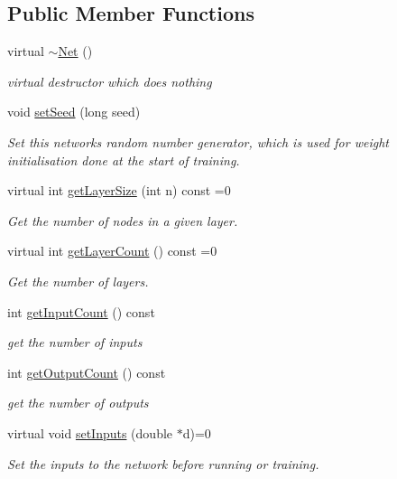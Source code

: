 \subsection*{Public Member Functions}
\begin{DoxyCompactItemize}
\item 
virtual \hyperlink{classNet_a882ce3a3037e5fe06f1a11f87cb0629d}{$\sim$\+Net} ()
\begin{DoxyCompactList}\small\item\em virtual destructor which does nothing \end{DoxyCompactList}\item 
void \hyperlink{classNet_a2ef424e05bfeff073bbca57a5735c121}{set\+Seed} (long seed)
\begin{DoxyCompactList}\small\item\em Set this network\textquotesingle{}s random number generator, which is used for weight initialisation done at the start of training. \end{DoxyCompactList}\item 
virtual int \hyperlink{classNet_a01aa05702b4cc818b9ae860675a6b219}{get\+Layer\+Size} (int n) const =0
\begin{DoxyCompactList}\small\item\em Get the number of nodes in a given layer. \end{DoxyCompactList}\item 
virtual int \hyperlink{classNet_a84682330293fe317a8b483eed2987939}{get\+Layer\+Count} () const =0
\begin{DoxyCompactList}\small\item\em Get the number of layers. \end{DoxyCompactList}\item 
int \hyperlink{classNet_a53df5c1c5703b73ee5a7ccb7537b66a9}{get\+Input\+Count} () const 
\begin{DoxyCompactList}\small\item\em get the number of inputs \end{DoxyCompactList}\item 
int \hyperlink{classNet_a5f96e2ae07bec62b8c97ab192528f3c3}{get\+Output\+Count} () const 
\begin{DoxyCompactList}\small\item\em get the number of outputs \end{DoxyCompactList}\item 
virtual void \hyperlink{classNet_a3c41ce6877aa3b04e5c19943bc78d007}{set\+Inputs} (double $\ast$d)=0
\begin{DoxyCompactList}\small\item\em Set the inputs to the network before running or training. \end{DoxyCompactList}\item 

\end{DoxyCompactItemize}
